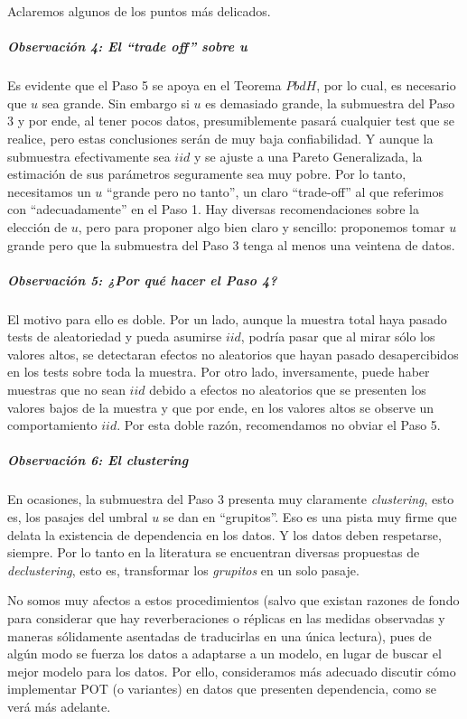 \documentclass[
  12pt]{article}
\begin{document}
Aclaremos algunos de los puntos más delicados.

\subparagraph{Observación 4: El ``trade off'' sobre
u}\label{observaciuxf3n-4-el-trade-off-sobre-u}

Es evidente que el Paso 5 se apoya en el Teorema \(PbdH\), por lo cual,
es necesario que \(u\) sea grande. Sin embargo si \(u\) es demasiado
grande, la submuestra del Paso 3 y por ende, al tener pocos datos,
presumiblemente pasará cualquier test que se realice, pero estas
conclusiones serán de muy baja confiabilidad. Y aunque la submuestra
efectivamente sea \(iid\) y se ajuste a una Pareto Generalizada, la
estimación de sus parámetros seguramente sea muy pobre. Por lo tanto,
necesitamos un \(u\) ``grande pero no tanto'', un claro ``trade-off'' al
que referimos con ``adecuadamente'' en el Paso 1. Hay diversas
recomendaciones sobre la elección de \(u\), pero para proponer algo bien
claro y sencillo: proponemos tomar \(u\) grande pero que la submuestra
del Paso 3 tenga al menos una veintena de datos.

\subparagraph{Observación 5: ¿Por qué hacer el Paso
4?}\label{observaciuxf3n-5-por-quuxe9-hacer-el-paso-4}

El motivo para ello es doble. Por un lado, aunque la muestra total haya
pasado tests de aleatoriedad y pueda asumirse \(iid\), podría pasar que
al mirar sólo los valores altos, se detectaran efectos no aleatorios que
hayan pasado desapercibidos en los tests sobre toda la muestra. Por otro
lado, inversamente, puede haber muestras que no sean \(iid\) debido a
efectos no aleatorios que se presenten los valores bajos de la muestra y
que por ende, en los valores altos se observe un comportamiento \(iid\).
Por esta doble razón, recomendamos no obviar el Paso 5.

\subparagraph{\texorpdfstring{Observación 6: El
\emph{clustering}}{Observación 6: El clustering}}\label{observaciuxf3n-6-el-clustering}

En ocasiones, la submuestra del Paso 3 presenta muy claramente
\emph{clustering}, esto es, los pasajes del umbral \(u\) se dan en
``grupitos''. Eso es una pista muy firme que delata la existencia de
dependencia en los datos. Y los datos deben respetarse, siempre. Por lo
tanto en la literatura se encuentran diversas propuestas de
\emph{declustering}, esto es, transformar los \emph{grupitos} en un solo
pasaje.

No somos muy afectos a estos procedimientos (salvo que existan razones
de fondo para considerar que hay reverberaciones o réplicas en las
medidas observadas y maneras sólidamente asentadas de traducirlas en una
única lectura), pues de algún modo se fuerza los datos a adaptarse a un
modelo, en lugar de buscar el mejor modelo para los datos. Por ello,
consideramos más adecuado discutir cómo implementar POT (o variantes) en
datos que presenten dependencia, como se verá más adelante.
\end{document}
